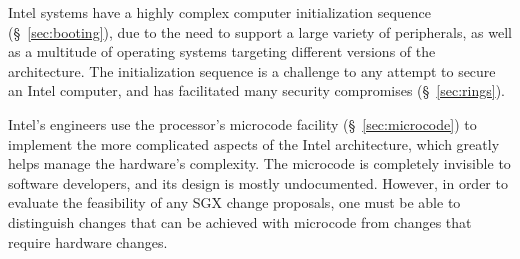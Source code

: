 Intel systems have a highly complex computer initialization sequence
(\S~\ref{sec:booting}), due to the need to support a large variety of
peripherals, as well as a multitude of operating systems targeting different
versions of the architecture. The initialization sequence is a challenge to any
attempt to secure an Intel computer, and has facilitated many security
compromises (\S~\ref{sec:rings}).

Intel's engineers use the processor's microcode facility
(\S~\ref{sec:microcode}) to implement the more complicated aspects of the Intel
architecture, which greatly helps manage the hardware's complexity. The
microcode is completely invisible to software developers, and its design is
mostly undocumented. However, in order to evaluate the feasibility of any SGX
change proposals, one must be able to distinguish changes that can be achieved
with microcode from changes that require hardware changes.
